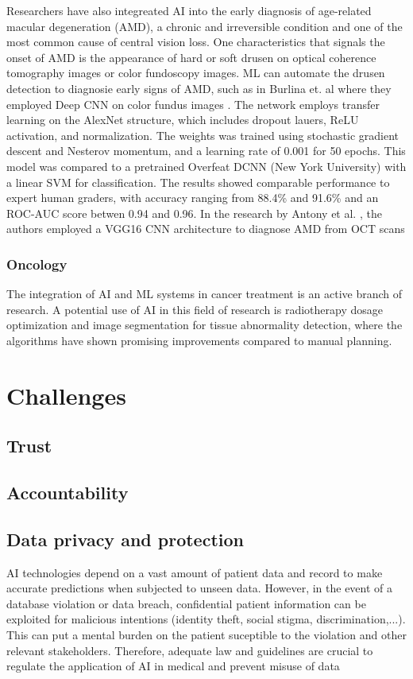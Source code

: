 \documentclass{article}
\begin{document}
Researchers have also integreated AI into the early diagnosis of age-related macular degeneration (AMD), a chronic and irreversible condition and one of the most common cause of central vision loss. 
One characteristics that signals the onset of AMD is the appearance of hard or soft drusen on optical coherence tomography images or color fundoscopy images.
ML can automate the drusen detection to diagnosie early signs of AMD, such as in Burlina et. al where they employed Deep CNN on color fundus images \cite{burlina_automated_2017}. The network employs transfer learning on the AlexNet structure, which includes dropout lauers, ReLU activation, and normalization. The weights was trained using stochastic gradient descent and Nesterov momentum, and a learning rate of 0.001 for 50 epochs. This model was compared to a pretrained Overfeat DCNN (New York University) with a linear SVM for classification. The results showed comparable performance to expert human graders, with accuracy ranging from 88.4\% and 91.6\% and an ROC-AUC score betwen 0.94 and 0.96.
In the research by Antony et al. \cite{}, the authors employed a VGG16 CNN architecture to diagnose AMD from OCT scans

\subsubsection{Oncology}
The integration of AI and ML systems in cancer treatment is an active branch of research.
A potential use of AI in this field of research is radiotherapy dosage optimization and image segmentation for tissue abnormality detection, where the algorithms have shown promising improvements compared to manual planning.



\section{Challenges}
\subsection{Trust}
\subsection{Accountability}
\subsection{Data privacy and protection}
AI technologies depend on a vast amount of patient data and record to make accurate predictions when subjected to unseen data.
However, in the event of a database violation or data breach, confidential patient information can be exploited for malicious intentions (identity theft, social stigma, discrimination,...).
This can put a mental burden on the patient suceptible to the violation and other relevant stakeholders.
Therefore, adequate law and guidelines are crucial to regulate the application of AI in medical and prevent misuse of data
\end{document}
